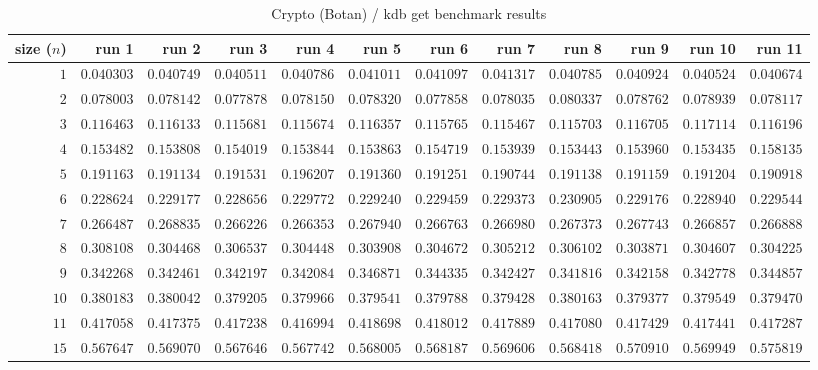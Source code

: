  
\begin{sidewaystable} \centering \caption{Crypto (Botan) / kdb get benchmark results} \label{eval-table-botan-get} \scriptsize \begin{tabular}{r|rrrrrrrrrrr} size ($n$) & run 1 & run 2 & run 3 & run 4 & run 5 & run 6 & run 7 & run 8 & run 9 & run 10 & run 11\\ \hline
$1$ & $0.040303$ & $0.040749$ & $0.040511$ & $0.040786$ & $0.041011$ & $0.041097$ & $0.041317$ & $0.040785$ & $0.040924$ & $0.040524$ & $0.040674$ \\
$2$ & $0.078003$ & $0.078142$ & $0.077878$ & $0.078150$ & $0.078320$ & $0.077858$ & $0.078035$ & $0.080337$ & $0.078762$ & $0.078939$ & $0.078117$ \\
$3$ & $0.116463$ & $0.116133$ & $0.115681$ & $0.115674$ & $0.116357$ & $0.115765$ & $0.115467$ & $0.115703$ & $0.116705$ & $0.117114$ & $0.116196$ \\
$4$ & $0.153482$ & $0.153808$ & $0.154019$ & $0.153844$ & $0.153863$ & $0.154719$ & $0.153939$ & $0.153443$ & $0.153960$ & $0.153435$ & $0.158135$ \\
$5$ & $0.191163$ & $0.191134$ & $0.191531$ & $0.196207$ & $0.191360$ & $0.191251$ & $0.190744$ & $0.191138$ & $0.191159$ & $0.191204$ & $0.190918$ \\
$6$ & $0.228624$ & $0.229177$ & $0.228656$ & $0.229772$ & $0.229240$ & $0.229459$ & $0.229373$ & $0.230905$ & $0.229176$ & $0.228940$ & $0.229544$ \\
$7$ & $0.266487$ & $0.268835$ & $0.266226$ & $0.266353$ & $0.267940$ & $0.266763$ & $0.266980$ & $0.267373$ & $0.267743$ & $0.266857$ & $0.266888$ \\
$8$ & $0.308108$ & $0.304468$ & $0.306537$ & $0.304448$ & $0.303908$ & $0.304672$ & $0.305212$ & $0.306102$ & $0.303871$ & $0.304607$ & $0.304225$ \\
$9$ & $0.342268$ & $0.342461$ & $0.342197$ & $0.342084$ & $0.346871$ & $0.344335$ & $0.342427$ & $0.341816$ & $0.342158$ & $0.342778$ & $0.344857$ \\
$10$ & $0.380183$ & $0.380042$ & $0.379205$ & $0.379966$ & $0.379541$ & $0.379788$ & $0.379428$ & $0.380163$ & $0.379377$ & $0.379549$ & $0.379470$ \\
$11$ & $0.417058$ & $0.417375$ & $0.417238$ & $0.416994$ & $0.418698$ & $0.418012$ & $0.417889$ & $0.417080$ & $0.417429$ & $0.417441$ & $0.417287$ \\
$15$ & $0.567647$ & $0.569070$ & $0.567646$ & $0.567742$ & $0.568005$ & $0.568187$ & $0.569606$ & $0.568418$ & $0.570910$ & $0.569949$ & $0.575819$ \\

\end{tabular}
\end{sidewaystable}
